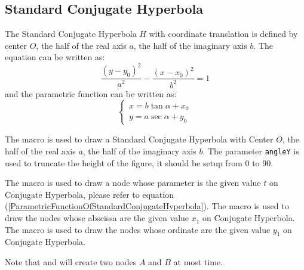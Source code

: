 \documentclass[11pt,english,BCOR=10mm,DIV=12,bibliography=totoc,parskip=false,headings=small,
    headinclude=false,footinclude=false,twoside,english]{pst-doc}
\begin{document}
\subsection{Standard Conjugate Hyperbola}
The Standard Conjugate Hyperbola $H$ with coordinate translation is defined by center $O$,
the half of the real axis $a$, the half of the imaginary axis $b$.
The equation can be written as:
\begin{equation}\label{FunctionOfStandardConjugateHyperbola}
\dfrac{(y-y_0)^2}{a^2}-\dfrac{(x-x_0)^2}{b^2}=1
\end{equation}
and the parametric function can be written as:
\begin{equation}\label{ParametricFunctionOfStandardConjugateHyperbola}
\left\{\begin{array}{l}
x=b\tan\alpha+x_0\\
y=a\sec\alpha+y_0
\end{array}\right.
\end{equation}

The macro  is used to draw a Standard Conjugate Hyperbola with Center $O$,
the half of the real axis $a$, the half of the imaginary axis $b$.
The parameter \texttt{angleY} is used to truncate the height of the figure,
it should be setup from 0 to 90.

\begin{BDef}
\OptArgs{}
\end{BDef}

The macro  is used to draw a node whose parameter is the given value $t$ on Conjugate Hyperbola,
please refer to equation (\ref{ParametricFunctionOfStandardConjugateHyperbola}).
The macro  is used to draw the nodes whose abscissa are the given value $x_1$ on Conjugate Hyperbola.
The macro  is used to draw the nodes whose ordinate are the given value $y_1$ on Conjugate Hyperbola.

Note that  and  will create two nodes $A$ and $B$ at most time.

\begin{BDef}
\OptArgs{}\\
\OptArgs{}\\
\OptArgs{}
\end{BDef}
\end{document}
